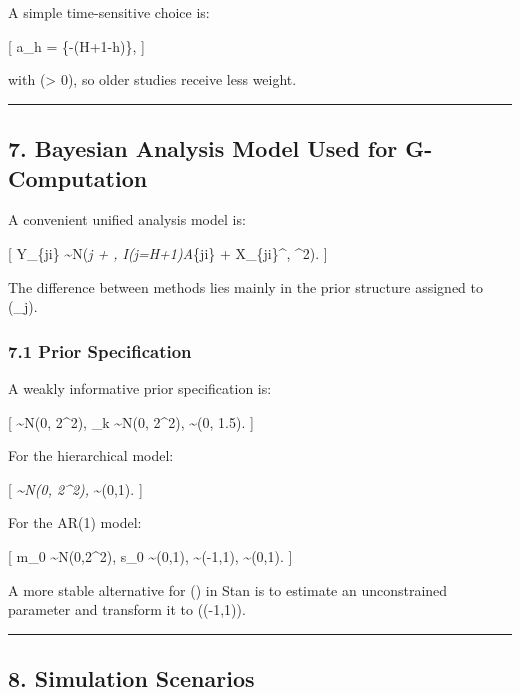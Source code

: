 \documentclass[
  letterpaper,
  DIV=11,
  numbers=noendperiod]{scrartcl}
\begin{document}
A simple time-sensitive choice is:

{[} a\_h = \exp\{-\lambda(H+1-h)\}, {]}

with (\lambda \textgreater{} 0), so older studies receive less weight.

\begin{center}\rule{0.5\linewidth}{0.5pt}\end{center}

\subsection{7. Bayesian Analysis Model Used for
G-Computation}\label{bayesian-analysis-model-used-for-g-computation}

A convenient unified analysis model is:

{[} Y\_\{ji\} \sim N(\alpha\emph{j + \tau , I(j=H+1)A}\{ji\} +
X\_\{ji\}\^{}\top \beta, \sigma\^{}2). {]}

The difference between methods lies mainly in the prior structure
assigned to (\alpha\_j).

\subsubsection{7.1 Prior Specification}\label{prior-specification}

A weakly informative prior specification is:

{[} \tau \sim N(0, 2\^{}2), \qquad \beta\_k \sim N(0, 2\^{}2),
\qquad \sigma \sim {}(0, 1.5). {]}

For the hierarchical model:

{[} \mu\emph{\alpha \sim N(0, 2\^{}2), \qquad
\tau}\alpha \sim {}(0,1). {]}

For the AR(1) model:

{[} m\_0 \sim N(0,2\^{}2), \qquad s\_0 \sim {}(0,1),
\qquad \phi \sim {}(-1,1), \qquad
\omega \sim {}(0,1). {]}

A more stable alternative for (\phi) in Stan is to estimate an
unconstrained parameter and transform it to ((-1,1)).

\begin{center}\rule{0.5\linewidth}{0.5pt}\end{center}

\subsection{8. Simulation Scenarios}\label{simulation-scenarios}
\end{document}
